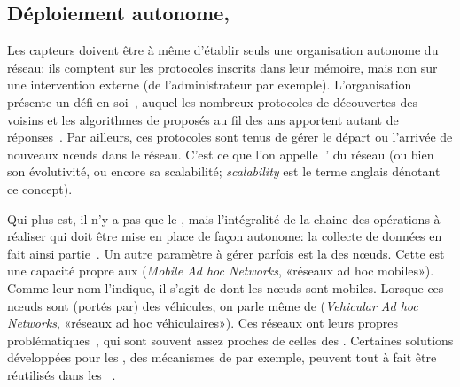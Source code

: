     \subsection{Déploiement autonome, }
Les capteurs doivent être à même d'établir seuls une organisation autonome du réseau: ils comptent sur les protocoles inscrits dans leur mémoire, mais non sur une intervention externe (de l'administrateur par exemple).
L'organisation présente un défi en soi~\cite{TV08}, auquel les nombreux protocoles de découvertes des voisins et les algorithmes de  proposés au fil des ans apportent autant de réponses~\cite{DQWH13}.
Par ailleurs, ces protocoles sont tenus de gérer le départ ou l'arrivée de nouveaux nœuds dans le réseau.
C'est ce que l'on appelle l' du réseau (ou bien son évolutivité, ou encore sa scalabilité; \textit{scalability} est le terme anglais dénotant ce concept).

Qui plus est, il n'y a pas que le , mais l'intégralité de la chaine des opérations à réaliser qui doit être mise en place de façon autonome: la collecte de données en fait ainsi partie~\cite{ZWPT10}.
Un autre paramètre à gérer parfois est la  des nœuds.
Cette  est une capacité propre aux \manet (\textit{Mobile Ad hoc Networks}, «réseaux ad hoc mobiles»).
Comme leur nom l'indique, il s'agit de \wanet dont les nœuds sont mobiles.
Lorsque ces nœuds sont (portés par) des véhicules, on parle même de \vanet (\textit{Vehicular Ad hoc Networks}, «réseaux ad hoc véhiculaires»).
Ces réseaux ont leurs propres problématiques~\cite{DYK12}, qui sont souvent assez proches de celles des \rcsfs.
Certaines solutions développées pour les \manet, des mécanismes de \secu par exemple, peuvent tout à fait être réutilisés dans les \rcs~\cite{BMS13}.

